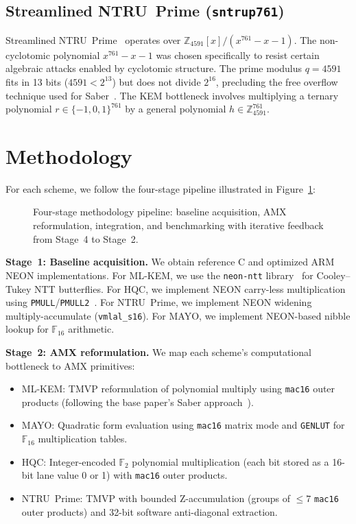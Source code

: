 \documentclass[utf8]{FrontiersinHarvard}
\newcommand{\boxedfigure}[1]{%
  \fcolorbox{BorderGray}{LightBg}{%
    \begin{minipage}{0.94\linewidth}
      \centering
      #1
    \end{minipage}}}
\begin{document}
\subsection{Streamlined NTRU~Prime (\texttt{sntrup761})}

Streamlined NTRU~Prime~\cite{ntruprime2017spec} operates over $\mathbb{Z}_{4591}[x]/(x^{761} - x - 1)$. The non-cyclotomic polynomial $x^{761} - x - 1$ was chosen specifically to resist certain algebraic attacks enabled by cyclotomic structure. The prime modulus $q = 4591$ fits in 13 bits ($4591 < 2^{13}$) but does not divide $2^{16}$, precluding the free overflow technique used for Saber~\cite{dangelo2018saber}. The KEM bottleneck involves multiplying a ternary polynomial $r \in \{-1, 0, 1\}^{761}$ by a general polynomial $h \in \mathbb{Z}_{4591}^{761}$.


\section{Methodology}
\label{sec:methodology}

For each scheme, we follow the four-stage pipeline illustrated in Figure~\ref{fig:methodology}:

\begin{figure}[htbp]
  \centering
  \boxedfigure{}
  \caption{Four-stage methodology pipeline: baseline acquisition, AMX reformulation, integration, and benchmarking with iterative feedback from Stage~4 to Stage~2.}
  \label{fig:methodology}
\end{figure}

\textbf{Stage~1: Baseline acquisition.} We obtain reference C and optimized ARM NEON implementations. For ML-KEM, we use the \texttt{neon-ntt} library~\cite{becker2022neon} for Cooley--Tukey NTT butterflies. For HQC, we implement NEON carry-less multiplication using \texttt{PMULL}/\texttt{PMULL2}~\cite{arm2021neon}. For NTRU~Prime, we implement NEON widening multiply-accumulate (\texttt{vmlal\_s16}). For MAYO, we implement NEON-based nibble lookup for $\mathbb{F}_{16}$ arithmetic.

\textbf{Stage~2: AMX reformulation.} We map each scheme's computational bottleneck to AMX primitives:
\begin{itemize}
  \item ML-KEM: TMVP reformulation of polynomial multiply using \texttt{mac16} outer products (following the base paper's Saber approach~\cite{gazzoni2024pqcamx}).
  \item MAYO: Quadratic form evaluation using \texttt{mac16} matrix mode and \texttt{GENLUT} for $\mathbb{F}_{16}$ multiplication tables.
  \item HQC: Integer-encoded $\mathbb{F}_2$ polynomial multiplication (each bit stored as a 16-bit lane value 0 or 1) with \texttt{mac16} outer products.
  \item NTRU~Prime: TMVP with bounded Z-accumulation (groups of $\leq 7$ \texttt{mac16} outer products) and 32-bit software anti-diagonal extraction.
\end{itemize}
\end{document}
